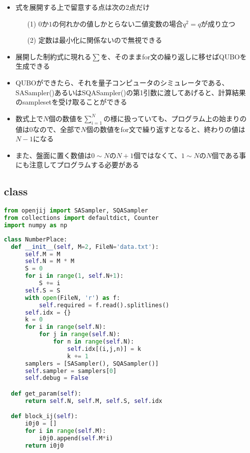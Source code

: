 \documentclass[uplatex,dvipdfmx,a4paper,11pt,oneside,openany]{jsbook}
\begin{document}
\begin{itemize}
\item 式を展開する上で留意する点は次の2点だけ
  \begin{itemize}
  \item[(1)] $0$か$1$の何れかの値しかとらない二値変数の場合$q^2=q$が成り立つ
  \item[(2)] 定数は最小化に関係ないので無視できる
  \end{itemize}
\item 展開した制約式に現れる$\sum$を、そのままfor文の繰り返しに移せばQUBOを生成できる
\item QUBOができたら、それを量子コンピュータのシミュレータである、SASampler()あるいはSQASampler()の第1引数に渡してあげると、計算結果のsamplesetを受け取ることができる
\item 数式上で$N$個の数値を$\sum_{i=1}^N$の様に扱っていても、プログラム上の始まりの値は$0$なので、全部で$N$個の数値をfor文で繰り返すとなると、終わりの値は$N-1$になる
\item また、盤面に置く数値は$0\sim N$の$N+1$個ではなくて、$1\sim N$の$N$個である事にも注意してプログラムする必要がある
\end{itemize}

\subsection{class}

\begin{lstlisting}[language=Python]
from openjij import SASampler, SQASampler
from collections import defaultdict, Counter
import numpy as np
\end{lstlisting}

\begin{lstlisting}[language=Python]
class NumberPlace:
  def __init__(self, M=2, FileN='data.txt'):
      self.M = M
      self.N = M * M
      S = 0
      for i in range(1, self.N+1):
          S += i
      self.S = S
      with open(FileN, 'r') as f:
          self.required = f.read().splitlines()
      self.idx = {}
      k = 0
      for i in range(self.N):
          for j in range(self.N):
              for n in range(self.N):
                  self.idx[(i,j,n)] = k
                  k += 1
      samplers = [SASampler(), SQASampler()]
      self.sampler = samplers[0]
      self.debug = False

  def get_param(self):
      return self.N, self.M, self.S, self.idx

  def block_ij(self):
      i0j0 = []
      for i in range(self.M):
          i0j0.append(self.M*i)
      return i0j0
\end{lstlisting}
\end{document}
